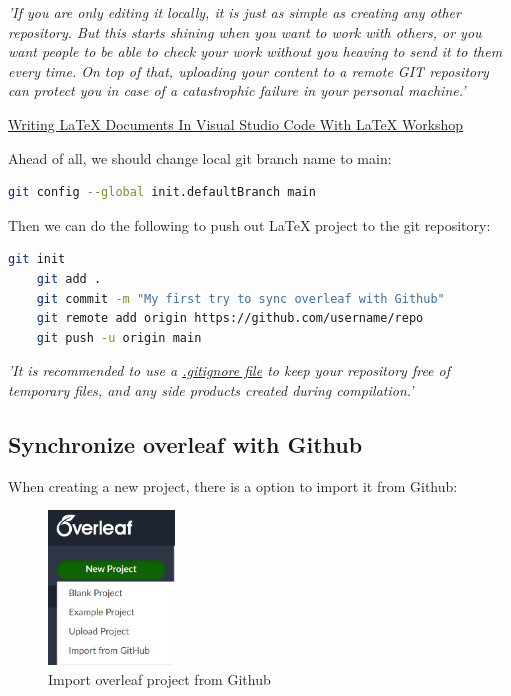 \emph{'If you are only editing it locally, it is just as simple as creating any other repository. But this starts shining when you want to work with others, or you want people to be able to check your work without you heaving to send it to them every time. On top of that, uploading your content to a remote GIT repository can protect you in case of a catastrophic failure in your personal machine.'}

\href{https://medium.com/@rcpassos/writing-latex-documents-in-visual-studio-code-with-latex-workshop-d9af6a6b2815}{Writing LaTeX Documents In Visual Studio Code With LaTeX Workshop} 

Ahead of all, we should change local git branch name to main:

\begin{lstlisting}[language=bash]
    git config --global init.defaultBranch main
\end{lstlisting}

Then we can do the following to push out LaTeX project to the git repository:

\begin{lstlisting}[language=bash]
    git init
    git add .
    git commit -m "My first try to sync overleaf with Github"
    git remote add origin https://github.com/username/repo
    git push -u origin main
\end{lstlisting}

\emph{'It is recommended to use a \href{https://github.com/github/gitignore/blob/main/TeX.gitignore}{.gitignore file} to keep your repository free of temporary files, and any side products created during compilation.'}

\subsection*{Synchronize overleaf with Github}

When creating a new project, there is a option to import it from Github:

\begin{figure}[h]
\centering
\includegraphics[width=0.3\textwidth]{./2023Mar/Import-From-Github.png}
\caption{Import overleaf project from Github}
\label{importfromgithub}
\end{figure}

